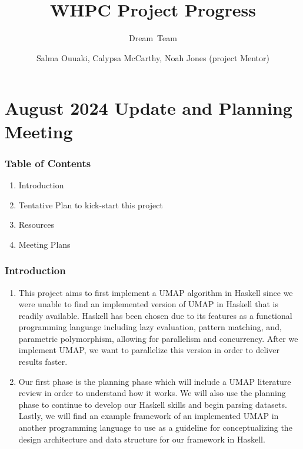 \documentclass{beamer}
\title{WHPC Project Progress}
\author[Team]{Dream~Team\inst{1}}
\institute[UF]{\inst{1}University of Florida}
\date{}
\author{Salma Ouuaki, Calypsa McCarthy, Noah Jones (project Mentor)}
\begin{document}
\frame{\titlepage}

\section{August 2024 Update and Planning Meeting}

\begin{frame}
  \frametitle{Table of Contents}
    \begin{enumerate}
      \item Introduction
      \item Tentative Plan to kick-start this project
      \item Resources
      \item Meeting Plans
    \end{enumerate}
\end{frame}

\begin{frame}
  \frametitle{Introduction}
\begin{enumerate}
  \item This project aims to first implement a UMAP algorithm in Haskell since we were unable to find an implemented version of UMAP in Haskell that is readily available. Haskell has been chosen due to its features as a functional programming language including lazy evaluation, pattern matching, and, parametric polymorphism, allowing for parallelism and concurrency. After we implement UMAP, we want to parallelize this version in order to deliver results faster.
  \item Our first phase is the planning phase which will include a UMAP literature review in order to understand how it works. We will also use the planning phase to continue to develop our Haskell skills and begin parsing datasets. Lastly, we will find an example framework of an implemented UMAP in another programming language to use as a guideline for conceptualizing the design architecture and data structure for our framework in Haskell.
\end{enumerate}

\end{frame}
\end{document}
